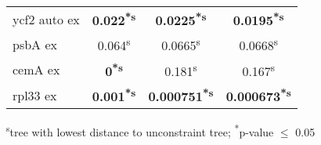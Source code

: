 \documentclass[a4paper]{article}
\begin{document}
\begin{longtable}{l|c|c|c}
ycf2 auto ex&\textbf{0.022\textsuperscript{*}\textsuperscript{s}}&\textbf{0.0225\textsuperscript{*}\textsuperscript{s}}&\textbf{0.0195\textsuperscript{*}\textsuperscript{s}}\\
psbA ex&0.064\textsuperscript{s}&0.0665\textsuperscript{s}&0.0668\textsuperscript{s}\\
cemA ex&\textbf{0\textsuperscript{*}\textsuperscript{s}}&0.181\textsuperscript{s}&0.167\textsuperscript{s}\\
rpl33 ex&\textbf{0.001\textsuperscript{*}\textsuperscript{s}}&\textbf{0.000751\textsuperscript{*}\textsuperscript{s}}&\textbf{0.000673\textsuperscript{*}\textsuperscript{s}}\\
\end{longtable}
\textsuperscript{s}tree with lowest distance to unconstraint tree; \textsuperscript{*}p-value $\leq$ 0.05
\end{document}
